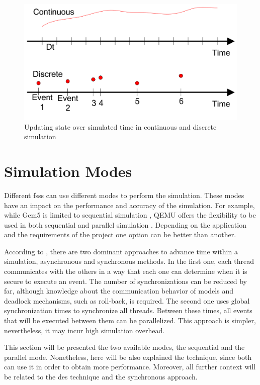 \begin{figure}[H]
	\centering
 	\includegraphics[width=0.7\linewidth]{Images/DesVsCes.png}
 	\caption{Updating state over simulated time in continuous and discrete simulation \cite{helal2008hybrid}}
	 \label{fig_DesVsCes}
\end{figure}


\section{Simulation Modes}

Different \glspl{fss} can use different modes to perform the simulation. These modes have an impact on the performance and accuracy of the simulation. For example, while Gem5 is limited to sequential simulation \cite{TheGem5Simulator}, QEMU offers the flexibility to be used in both sequential and parallel simulation \cite{QEMUDoc}. Depending on the application and the requirements of the project one option can be better than another.

According to \cite{parallelTypes}, there are two dominant approaches to advance time within a simulation, asynchronous and synchronous methods. In the first one, each thread communicates with the others in a way that each one can determine when it is secure to execute an event. The number of synchronizations can be reduced by far, although knowledge about the communication behavior of models and deadlock mechanisms, such as roll-back, is required. The second one uses global synchronization times to synchronize all threads. Between these times, all events that will be executed between them can be parallelized. This approach is simpler, nevertheless, it may incur high simulation overhead.

This section will be presented the two available modes, the sequential and the parallel mode. Nonetheless, here will be also explained the  technique, since both can use it in order to obtain more performance. Moreover, all further context will be related to the \gls{des} technique and the synchronous approach.


